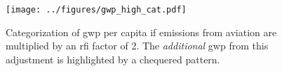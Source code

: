 \documentclass[a4paper,11pt,abstract=true]{scrartcl}
\begin{document}



\begin{figure}[htp]
  \centering
  \texttt{[image: ../figures/gwp\_high\_cat.pdf]}
  \caption{Categorization of \ac{gwp} per capita if emissions from aviation are multiplied by an \ac{rfi} factor of 2.
  The \emph{additional} \ac{gwp} from this adjustment is highlighted by a chequered pattern.}
  \label{fig:avi_cat_gwp_pc}
\end{figure}



\end{document}
